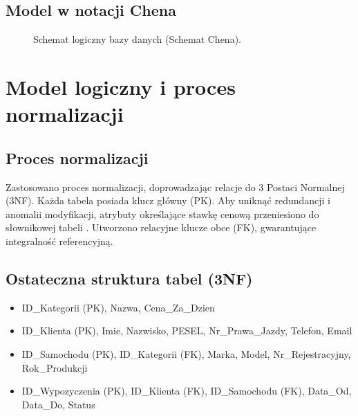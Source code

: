 \documentclass[a4paper,11pt,english,openany,oneside]{sphinxmanual}
\begin{document}
\subsection{Model w notacji Chena}
\label{\detokenize{rozdzial_3/index:model-w-notacji-chena}}
\begin{figure}[H]
\centering
\capstart

\noindent{}
\caption{Schemat logiczny bazy danych (Schemat Chena).}\label{\detokenize{rozdzial_3/index:id1}}\end{figure}


\section{Model logiczny i proces normalizacji}
\label{\detokenize{rozdzial_3/index:model-logiczny-i-proces-normalizacji}}

\subsection{Proces normalizacji}
\label{\detokenize{rozdzial_3/index:proces-normalizacji}}
\sphinxAtStartPar
Zastosowano proces normalizacji, doprowadzając relacje do 3 Postaci Normalnej (3NF). Każda tabela posiada klucz główny (PK). Aby uniknąć redundancji i anomalii modyfikacji, atrybuty określające stawkę cenową przeniesiono do słownikowej tabeli . Utworzono relacyjne klucze obce (FK), gwarantujące integralność referencyjną.


\subsection{Ostateczna struktura tabel (3NF)}
\label{\detokenize{rozdzial_3/index:ostateczna-struktura-tabel-3nf}}\begin{itemize}
\item {} 
\sphinxAtStartPar
{} ID\_Kategorii (PK), Nazwa, Cena\_Za\_Dzien

\item {} 
\sphinxAtStartPar
{} ID\_Klienta (PK), Imie, Nazwisko, PESEL, Nr\_Prawa\_Jazdy, Telefon, Email

\item {} 
\sphinxAtStartPar
{} ID\_Samochodu (PK), ID\_Kategorii (FK), Marka, Model, Nr\_Rejestracyjny, Rok\_Produkcji

\item {} 
\sphinxAtStartPar
{} ID\_Wypozyczenia (PK), ID\_Klienta (FK), ID\_Samochodu (FK), Data\_Od, Data\_Do, Status

\end{itemize}
\end{document}
